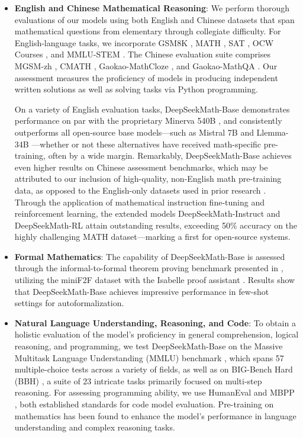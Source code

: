 \begin{itemize}[topsep=0pt]
    \item \textbf{English and Chinese Mathematical Reasoning}: We perform thorough evaluations of our models using both English and Chinese datasets that span mathematical questions from elementary through collegiate difficulty. For English-language tasks, we incorporate GSM8K \citep{gsm8k}, MATH \citep{MATH}, SAT \citep{llemma}, OCW Courses \citep{minerva}, and MMLU-STEM \citep{mmlu}. The Chinese evaluation suite comprises MGSM-zh \citep{mgsm}, CMATH \citep{wei2023cmath}, Gaokao-MathCloze \citep{agieval}, and Gaokao-MathQA \citep{agieval}. Our assessment measures the proficiency of models in producing independent written solutions as well as solving tasks via Python programming.

On a variety of English evaluation tasks, DeepSeekMath-Base demonstrates performance on par with the proprietary Minerva 540B \citep{minerva}, and consistently outperforms all open-source base models—such as Mistral 7B \citep{mistral} and Llemma-34B \citep{llemma}—whether or not these alternatives have received math-specific pre-training, often by a wide margin. Remarkably, DeepSeekMath-Base achieves even higher results on Chinese assessment benchmarks, which may be attributed to our inclusion of high-quality, non-English math pre-training data, as opposed to the English-only datasets used in prior research \citep{minerva,llemma}. Through the application of mathematical instruction fine-tuning and reinforcement learning, the extended models DeepSeekMath-Instruct and DeepSeekMath-RL attain outstanding results, exceeding 50\% accuracy on the highly challenging MATH dataset—marking a first for open-source systems.

\item \textbf{Formal Mathematics}: The capability of DeepSeekMath-Base is assessed through the informal-to-formal theorem proving benchmark presented in \citep{dsp_proof}, utilizing the miniF2F dataset \citep{minif2f} with the Isabelle proof assistant \citep{isabelle}. Results show that DeepSeekMath-Base achieves impressive performance in few-shot settings for autoformalization.

\item \textbf{Natural Language Understanding, Reasoning, and Code}: To obtain a holistic evaluation of the model’s proficiency in general comprehension, logical reasoning, and programming, we test DeepSeekMath-Base on the Massive Multitask Language Understanding (MMLU) benchmark \citep{mmlu}, which spans 57 multiple-choice tests across a variety of fields, as well as on BIG-Bench Hard (BBH) \citep{bbh}, a suite of 23 intricate tasks primarily focused on multi-step reasoning. For assessing programming ability, we use HumanEval \citep{codex} and MBPP \citep{mbpp}, both established standards for code model evaluation. Pre-training on mathematics has been found to enhance the model's performance in language understanding and complex reasoning tasks.


\end{itemize}
